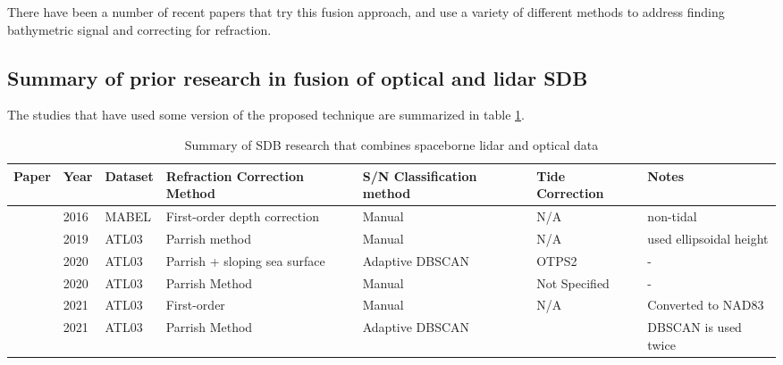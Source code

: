 There have been a number of recent papers that try this fusion approach, and use a variety of different methods to address finding bathymetric signal and correcting for refraction.

\subsection{Summary of prior research in fusion of optical and lidar SDB}

The studies that have used some version of the proposed technique are summarized in table \ref{researchsummary}.

\begin{landscape}
      \begin{table}
            \label{researchsummary}
            \caption{Summary of SDB research that combines spaceborne lidar and optical data}
            \begin{tabular}{p{3.7cm}llp{3.2cm}p{3.5cm}ll}
                  \midrule
                  Paper                              & Year & Dataset & Refraction Correction Method  & S/N Classification method      & Tide Correction & Notes                        \\
                  \hline
                  \citeauthor{Forfinski-Sarkozi2016} & 2016 & MABEL   & First-order depth correction  & Manual                         & N/A             & non-tidal                    \\
                  \citeauthor{Parrish2019}           & 2019 & ATL03   & Parrish method                & Manual                         & N/A             & used  ellipsoidal height     \\
                  \citeauthor{Ma2020}                & 2020 & ATL03   & Parrish + sloping sea surface & Adaptive DBSCAN                & OTPS2           & -                            \\
                  \citeauthor{Thomas2021d}           & 2020 & ATL03   & Parrish Method                & Manual                         & Not Specified   & -                            \\
                  \citeauthor{Albright2021}          & 2021 & ATL03   & First-order                   & Manual                         & N/A             & Converted to NAD83           \\
                  \citeauthor{Xie2021}               & 2021 & ATL03   & Parrish Method                & Adaptive DBSCAN                &                 & DBSCAN  is used twice        \\

\end{tabular}
\end{table}
\end{landscape}
